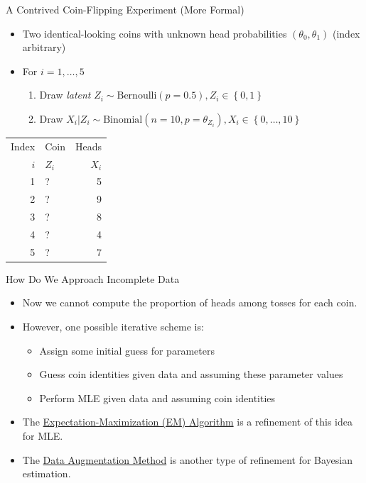 \documentclass[dvipdfmx,bigger,aspectratio=169]{beamer}
\begin{document}
\begin{frame}[label={sec:orga4c83f4}]{A Contrived Coin-Flipping Experiment (More Formal)}
\begin{itemize}
\item Two identical-looking coins with unknown head probabilities \((\theta_{0},\theta_{1})\) (index arbitrary)
\item For \(i = 1, \dots, 5\)
\begin{enumerate}
\item Draw \emph{latent} \(Z_{i} \sim \text{Bernoulli}(p = 0.5), Z_{i} \in \left\{ 0,1 \right\}\)
\item Draw \(X_{i} | Z_{i} \sim \text{Binomial}(n = 10, p = \theta_{Z_{i}}), X_{i} \in \left\{ 0, \dots, 10 \right\}\)
\end{enumerate}
\end{itemize}
\begin{center}
\begin{tabular}{rlr}
Index & Coin & Heads\\
\(i\) & \(Z_{i}\) & \(X_{i}\)\\
\hline
1 & ? & 5\\
2 & ? & 9\\
3 & ? & 8\\
4 & ? & 4\\
5 & ? & 7\\
\end{tabular}
\end{center}
\end{frame}

\begin{frame}[label={sec:org8dc5163}]{How Do We Approach Incomplete Data}
\begin{itemize}
\item Now we cannot compute the proportion of heads among tosses for each coin.
\item However, one possible iterative scheme is:
\begin{itemize}
\item Assign some initial guess for parameters
\item Guess coin identities given data and assuming these parameter values
\item Perform MLE given data and assuming coin identities
\end{itemize}
\item The \hyperlink{sec:orge51736c}{Expectation-Maximization (EM) Algorithm} \cite{dempsterMaximumLikelihoodIncomplete1977} is a refinement of this idea for MLE.
\item The \hyperlink{sec:orga3444c4}{Data Augmentation Method} \cite{tannerCalculationPosteriorDistributions1987} is another type of refinement for Bayesian estimation.
\end{itemize}
\end{frame}
\end{document}
